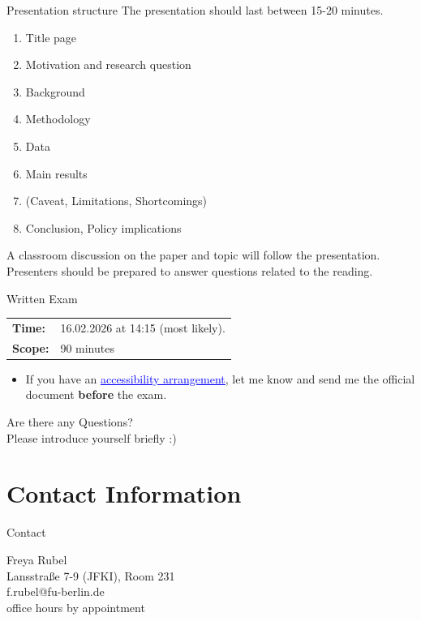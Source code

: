 \documentclass{beamer}
\begin{document}
\begin{frame}{Presentation structure}
The presentation should last between 15-20 minutes.
    \begin{enumerate}
        \item Title page
        \item Motivation and research question
        \item Background
        \item Methodology
        \item Data 
        \item Main results 
        \item (Caveat, Limitations, Shortcomings)
        \item Conclusion, Policy implications
    \end{enumerate}
    A classroom discussion on the paper and topic will follow the presentation. Presenters should be prepared to answer questions related to the reading.
\end{frame}

\begin{frame}{Written Exam}
\begin{tabular}{ll}
     \textbf{Time:} & 16.02.2026 at 14:15 (most likely). \\
    \textbf{Scope:} & 90 minutes 
\end{tabular}
\begin{itemize}
    \item If you have an \href{https://www.fu-berlin.de/en/sites/studium-barrierefrei/beratung/studierende/FAQ-NTA/index.html}{\textcolor{blue}{\underline{accessibility arrangement}}}, let me know and send me the official document \textbf{before} the exam.
\end{itemize}
\end{frame}

\begin{frame}{}
    \begin{center}
        \begin{Large}
            Are there any Questions? \pause \vspace{1cm}\\
            Please introduce yourself briefly :)
        \end{Large} 
    \end{center}
\end{frame}

\section{Contact Information}
\begin{frame}{Contact}
\begin{tcolorbox}
    Freya Rubel \\
    Lansstraße 7-9 (JFKI), Room 231 \\
    f.rubel@fu-berlin.de \\
    office hours by appointment
\end{tcolorbox}

\end{frame}
\end{document}

